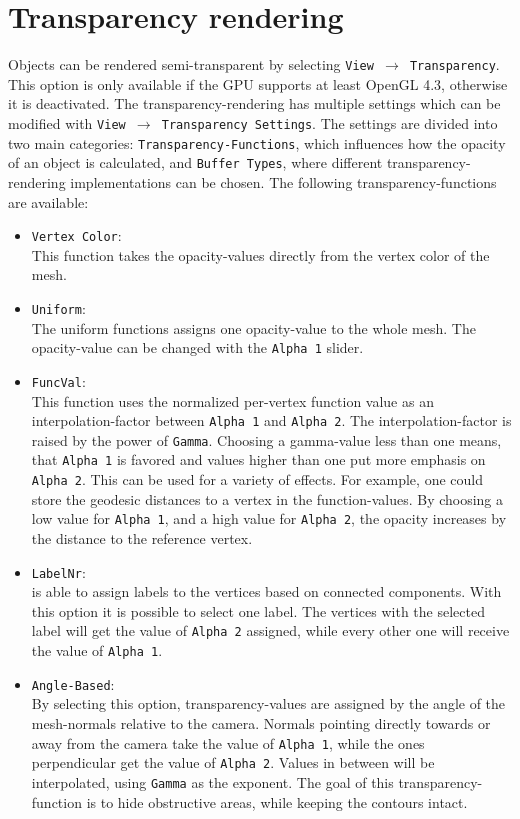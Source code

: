 \section{Transparency rendering}
Objects can be rendered semi-transparent by selecting \texttt{View $\rightarrow$ Transparency}. This option is only available if the GPU supports at least OpenGL 4.3, otherwise it is deactivated. The transparency-rendering has multiple settings which can be modified with \texttt{View $\rightarrow$ Transparency Settings}. The settings are divided into two main categories: \texttt{Transparency-Functions}, which influences how the opacity of an object is calculated, and \texttt{Buffer Types}, where different transparency-rendering implementations can be chosen. The following transparency-functions are available:
\begin{itemize}
\item \texttt{Vertex Color}:\\
This function takes the opacity-values directly from the vertex color of the mesh.
\item \texttt{Uniform}:\\
The uniform functions assigns one opacity-value to the whole mesh. The opacity-value can be changed with the \texttt{Alpha 1} slider.
\item \texttt{FuncVal}:\\
This function uses the normalized per-vertex function value as an interpolation-factor between \texttt{Alpha 1} and \texttt{Alpha 2}. The interpolation-factor is raised by the power of \texttt{Gamma}. Choosing a gamma-value less than one means, that \texttt{Alpha 1} is favored and values higher than one put more emphasis on \texttt{Alpha 2}. This can be used for a variety of effects. For example, one could store the geodesic distances to a vertex in the function-values. By choosing a low value for \texttt{Alpha 1}, and a high value for \texttt{Alpha 2}, the opacity increases by the distance to the reference vertex.
\item \texttt{LabelNr}:\\
\GigaMesh is able to assign labels to the vertices based on connected components. With this option it is possible to select one label. The vertices with the selected label will get the value of \texttt{Alpha 2} assigned, while every other one will receive the value of \texttt{Alpha 1}.
\item \texttt{Angle-Based}:\\
By selecting this option, transparency-values are assigned by the angle of the mesh-normals relative to the camera. Normals pointing directly towards or away from the camera take the value of \texttt{Alpha 1}, while the ones perpendicular get the value of \texttt{Alpha 2}. Values in between will be interpolated, using \texttt{Gamma}  as the exponent. The goal of this transparency-function is to hide obstructive areas, while keeping the contours intact.

\end{itemize}

